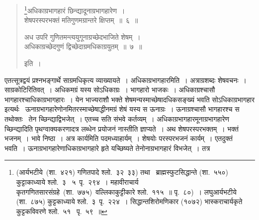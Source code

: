 \documentclass[11pt, openany]{book}
\begin{document}
\begin{quote} 
{\ks
\renewcommand{\thefootnote}{*}\footnote{(आर्यभटीये~(शा.~४२१) गणितपादे श्लो.~३२\textendash\ ३३) तथा \textendash\ ब्राह्मस्फुटसिद्धान्ते (शा.~५५०) कुट्टाकाध्याये श्लो.~३ \textendash\ ५~पृ.~२९४~। महावीराचार्य कृतगणितसारसंग्रहे~(शा.~७७५)~वल्लिकाकुट्टीकारे श्लो.~११५~॥ पृ.~८०)~। लघुआर्यभटीये (शा.~८७५) कुट्टकाध्याये श्लो.~३~पृ.~२२४~। सिद्धान्तशिरोमणिकार (१०७२) भास्कराचार्यकृते कुट्टकविवरणे श्लो.~५१~ पृ.~५९~॥}अधिकाग्रभागहारं छिन्द्यादूनाग्रभागहारेण~।\\
शेषपरस्परभक्तं मतिगुणमग्रान्तरे क्षिप्तम्~॥~६~॥

अध उपरि गुणितमन्त्ययुगूनाग्रच्छेदभाजिते शेषम्~।\\
अधिकाग्रच्छेदगुणं द्विच्छेदाग्रमधिकाग्रयुतम्~॥~७~॥} इति~।
\end{quote}

\indent
एतत्सूत्रद्वयं प्रश्नभङ्गार्थे साग्रमधिकृत्य व्याख्यायते~। अधिकाग्रभागहारमिति~। अत्राग्रशब्दः शेषवचनः~। साग्रकोटिरितिवत्~। अधिकमग्रं यस्य सोऽधिकाग्रः~। भागहारो भाजकः~। अधिकाग्रश्चासौ भागहारश्चाधिकाग्रभागहारः~। येन भाज्यराशौ भक्ते शेषमन्यस्माच्छेषादधिकसङ्ख्यं भवति सोऽधिकाग्रभागहार इत्यर्थः \textendash \ ऊनाग्रभागहारेणोनमितरस्माच्छेषाद्धीनमग्रं शेषं यस्य स ऊनाग्रः~। ऊनाग्रश्चासौ भागहारश्च स तथोक्तः \textendash\ तेन च्छिन्द्याद्विभजेत्~। एतच्च सति संभवे कर्तव्यम्~। अधिकाग्रभागहारमूनाग्रभागहारेण च्छिन्द्यादिति पृथग्वाक्यकरणादत्र लब्धेन प्रयोजनं नास्तीति ज्ञाप्यते~। अथ शेषपरस्परभक्तम्~। भक्तं भजनम्~। भावे निष्ठा~। अत्र
कार्यमिति पदमध्याहार्यम्~। शेषयोः परस्परभजनं कार्यम्~। एतदुक्तं भवति~। ऊनाग्रभागहारेणाधिकाग्रभागहारे हृते यच्छिष्यते तेनोनाग्रभागहारं विभजेत्~। तत्र

\newpage
\thispagestyle{fancy}
\fancyhf{}
\end{document}
